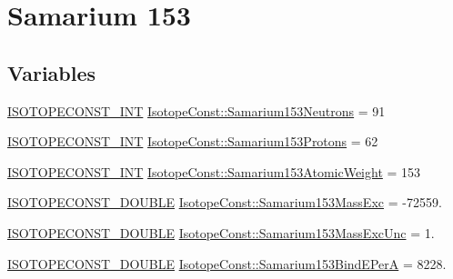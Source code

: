 \hypertarget{group___isotope_const-_samarium-_sm153}{}\section{Samarium 153}
\label{group___isotope_const-_samarium-_sm153}
\subsection*{Variables}
\begin{DoxyCompactItemize}
\item 
\mbox{\hyperlink{group___isotope_const-_macros_ga5f18360b3e99483a35c32d789e62621c}{I\+S\+O\+T\+O\+P\+E\+C\+O\+N\+S\+T\+\_\+\+I\+NT}} \mbox{\hyperlink{group___isotope_const-_samarium-_sm153_gab7aadc1bb15ced1d5abbdd7f42b5497d}{Isotope\+Const\+::\+Samarium153\+Neutrons}} = 91
\item 
\mbox{\hyperlink{group___isotope_const-_macros_ga5f18360b3e99483a35c32d789e62621c}{I\+S\+O\+T\+O\+P\+E\+C\+O\+N\+S\+T\+\_\+\+I\+NT}} \mbox{\hyperlink{group___isotope_const-_samarium-_sm153_gab1f1abed33a2de23081cc414ce25cce4}{Isotope\+Const\+::\+Samarium153\+Protons}} = 62
\item 
\mbox{\hyperlink{group___isotope_const-_macros_ga5f18360b3e99483a35c32d789e62621c}{I\+S\+O\+T\+O\+P\+E\+C\+O\+N\+S\+T\+\_\+\+I\+NT}} \mbox{\hyperlink{group___isotope_const-_samarium-_sm153_ga466e4d5ea17bbceed2d6589859b8e99d}{Isotope\+Const\+::\+Samarium153\+Atomic\+Weight}} = 153
\item 
\mbox{\hyperlink{group___isotope_const-_macros_ga8f45a7272ce02c0b4c65c44636ed719a}{I\+S\+O\+T\+O\+P\+E\+C\+O\+N\+S\+T\+\_\+\+D\+O\+U\+B\+LE}} \mbox{\hyperlink{group___isotope_const-_samarium-_sm153_gaec618f2745f27c52ed8de9b36ecd3bb3}{Isotope\+Const\+::\+Samarium153\+Mass\+Exc}} = -\/72559.
\item 
\mbox{\hyperlink{group___isotope_const-_macros_ga8f45a7272ce02c0b4c65c44636ed719a}{I\+S\+O\+T\+O\+P\+E\+C\+O\+N\+S\+T\+\_\+\+D\+O\+U\+B\+LE}} \mbox{\hyperlink{group___isotope_const-_samarium-_sm153_gab2eac4c5e26a95d4fd5ed06274e1378e}{Isotope\+Const\+::\+Samarium153\+Mass\+Exc\+Unc}} = 1.
\item 
\mbox{\hyperlink{group___isotope_const-_macros_ga8f45a7272ce02c0b4c65c44636ed719a}{I\+S\+O\+T\+O\+P\+E\+C\+O\+N\+S\+T\+\_\+\+D\+O\+U\+B\+LE}} \mbox{\hyperlink{group___isotope_const-_samarium-_sm153_ga4d36e6af72f4e1e86fcf16cf0537a760}{Isotope\+Const\+::\+Samarium153\+Bind\+E\+PerA}} = 8228.
\item 

\end{DoxyCompactItemize}
